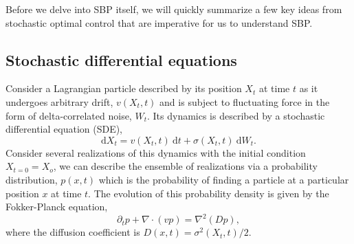\documentclass[12pt]{article}
\def\d{\mathrm{d}}
\def\grad{\nabla}
\begin{document}
\begin{singlespace}
Before we delve into SBP itself, we will quickly summarize a few key ideas from stochastic optimal control that are imperative for us to understand SBP.

\subsection{Stochastic differential equations}

Consider a Lagrangian particle described by its position $X_t$ at time $t$ as it undergoes arbitrary drift, $v(X_t, t)$ and is subject to fluctuating force in the form of delta-correlated noise, $W_t$. Its dynamics is described by a stochastic differential equation (SDE),
\begin{equation}
    \d X_t = v(X_t, t) \ \d t + \sigma (X_t, t)\ \d W_t.
\end{equation}
Consider several realizations of this dynamics with the initial condition $X_{t=0} = X_o$, we can describe the ensemble of realizations via a probability distribution, $p(x, t)$ which is the probability of finding a particle at a particular position $x$ at time $t$. The evolution of this probability density is given by the Fokker-Planck equation,
\begin{equation}
    \partial_t p + \grad\cdot (v p) = \grad^2 (Dp),
    \label{eq:FPP}
\end{equation}
where the diffusion coefficient is $D(x, t) = \sigma^2(X_t, t)/2$.


\end{singlespace}
\end{document}
